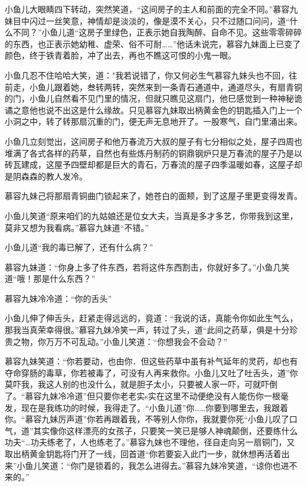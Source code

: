 \documentclass[12pt,oneside]{book}
\begin{document}
小鱼儿大眼睛四下转动，突然笑道，``这间房子的主人和前面的完全不同。''慕容九妹目中闪过一丝笑意，神情却是淡淡的，像是漠不关心，只不过随口问问，道``什么不同？''小鱼儿道``这房子里绿色，正表示她自我陶醉、自命不见。这些零零碎碎的东西，也正表示她幼稚、虚荣、俗不可耐\ldots\ldots{}''他话未说完，慕容九妹面上已变了颜色，终于铁青着脸，冲了出去，再也不瞧这可恨的小鬼一眼。

小鱼几忍不住哈哈大笑，道："我若说错了，你又何必生气慕容九妹头也不回，往前走，小鱼儿跟着她，叁转两转，突然来到一条青石通道中，通道尽头，有扇青铜的门，小鱼儿自然看不见门里的情况，但就只瞧见这扇门，他巳感觉到一种神秘诡谲之意他也说不出这是什么缘故。只见慕容九妹取出柄黄金色的钥匙插入门上一个小洞之中，转了转那扇沉重的门，便无声无息地开了。一股寒气，自门里涌出来。

小鱼几立刻觉出，这间房子和他万春流万大叔的屋子有七分相似之处，屋子四周也堆满了各式各样的药草，自然也有些炼丹制药的铜鼎钢炉只是万春流的屋子乃是以砖瓦建成，这屋予四壁却都是巨大的青石，万春流的屋子四季温暖如春，这屋子却是阴森森的教人发冷。

慕容九妹己将那扇青铜曲门锁起来了，她苍白的面颊，到了这屋子里更变得发青。

小鱼儿笑道``原来咱们的九姑娘还是位女大夫，当真是多才多艺，你带我到这里，莫非又想为我看病。''慕容九妹道``不错。''

小鱼儿道``我的毒已解了，还有什么病？''

慕容九妹道：``你身上多了件东西，若将这件东西割击，你就好多了。''小鱼几笑道``哦！那是什么东西？''

慕容九妹冷冷道：``你的舌头''

小鱼儿伸了伸舌头，赶紧走得远远的，竟道：``我说的话，真能令你如此生气么，那我当真荣幸得很。''慕容九妹冷笑一声，转过了头，道``此间之药草，俱是十分珍贵之物，你万万不可乱动。''小鱼儿笑道：``你想我会不会动？''

慕容九妹笑道：``你若要动，也由你．但这些药草中虽有补气延年的灵药，却也有夺命穿肠的毒草，你若被毒了，可没有人再来救你。小鱼儿又吐了吐舌头，道''你莫吓我，我这人别的也没什么，就是胆子太小，只要被人家一吓，可就吓倒了。``慕容九妹冷冷道''但只要你老老实s实在这里不动便绝没有人能伤你一根毫发，现在是我练功的时候，我得走了。``小鱼儿道''你\ldots\ldots 你要到哪里去，我跟着你。``慕容九妹厉声道''你若再跟着我，不等别人你你，我就要你死``小鱼儿叹了口气，道''其实像你这样漂亮的女孩子，只要笑一笑已是够人神魂颠倒，还要练什么功夫``\ldots 功夫练老了，人也练老了。''慕容九妹也不理他，径自走向另一扇铜门，又取出柄黄金钥匙将门开了一线，回首道``你若要妄入此门一步，就休想再活着出来''小鱼儿笑道：``你门是锁着的，我怎么进得去。''慕容九妹冷笑道，``谅你也进不来的。''
\end{document}
